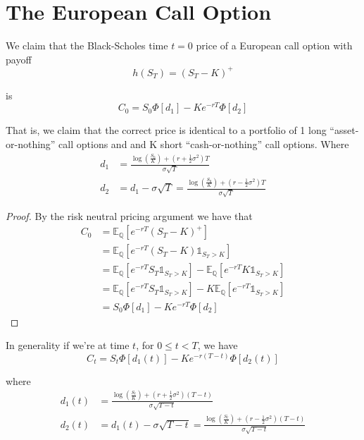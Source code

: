 \documentclass[12pt]{article}
\newlength\tindent
\renewcommand{\indent}{\hspace*{\tindent}}
\begin{document}
\section{The European Call Option}

We claim that the Black-Scholes time $t = 0$ price of a European call option with payoff
\begin{equation*}
	h(S_T) = (S_T - K)^+
\end{equation*}

is
\begin{equation*}
	C_0 = S_0\Phi[d_1] - Ke^{-rT}\Phi[d_2]
\end{equation*}

\indent That is, we claim that the correct price is identical to a portfolio of 1 long ``asset-or-nothing'' call options and and K short ``cash-or-nothing'' call options. Where
\begin{align*}
	d_1 &= \frac{\log(\frac{S_0}{K}) + (r + \frac{1}{2}\sigma^2)T}{\sigma\sqrt{T}} \\
	d_2 &= d_1 - \sigma\sqrt{T} = \frac{\log(\frac{S_0}{K}) + (r - \frac{1}{2}\sigma^2)T}{\sigma\sqrt{T}}
\end{align*}

\begin{proof} By the risk neutral pricing argument we have that
\begin{align*}
	C_0 &= \mathbb E_{\mathbb Q}[e^{-rT}(S_T - K)^+] \\
		&= \mathbb E_{\mathbb Q}[e^{-rT}(S_T - K) \mathds 1_{S_T > K}] \\
		&= \mathbb E_{\mathbb Q}[e^{-rT} S_T \mathds 1_{S_T > K}] - \mathbb E_{\mathbb Q}[e^{-rT} K \mathds 1_{S_T > K}] \\
		&= \mathbb E_{\mathbb Q}[e^{-rT} S_T \mathds 1_{S_T > K}] - K\mathbb E_{\mathbb Q}[e^{-rT} \mathds 1_{S_T > K}] \\
		&= S_0\Phi[d_1] - Ke^{-rT}\Phi[d_2]
\end{align*}
\end{proof}

In generality if we're at time $t$, for $0 \leq t < T$, we have
\begin{equation*}
	C_t = S_t\Phi[d_1(t)] - Ke^{-r(T - t)}\Phi[d_2(t)]
\end{equation*}

where
\begin{align*}
	d_1(t) &= \frac{\log(\frac{S_t}{K}) + (r + \frac{1}{2}\sigma^2)(T - t)}{\sigma\sqrt{T - t}} \\
	d_2(t) &= d_1(t) - \sigma\sqrt{T - t} = \frac{\log(\frac{S_t}{K}) + (r - \frac{1}{2}\sigma^2)(T - t)}{\sigma\sqrt{T - t}}
\end{align*}
\end{document}

